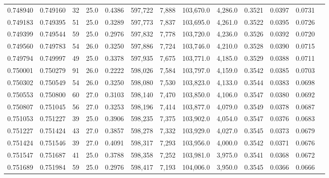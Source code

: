 \begin{tabular}{rrrrrrrrrrrrr}
0.748940 & 0.749160 &    32 & 25.0 &                                     0.4386 & 597,722 &   7,888 & 103,670.0 &   4,286.0 & 0.3521 & 0.0397 & 0.0731 \\
0.749183 & 0.749395 &    51 & 25.0 &                                     0.3289 & 597,773 &   7,837 & 103,695.0 &   4,261.0 & 0.3522 & 0.0395 & 0.0726 \\
0.749399 & 0.749544 &    59 & 25.0 &                                     0.2976 & 597,832 &   7,778 & 103,720.0 &   4,236.0 & 0.3526 & 0.0392 & 0.0720 \\
0.749560 & 0.749783 &    54 & 26.0 &                                     0.3250 & 597,886 &   7,724 & 103,746.0 &   4,210.0 & 0.3528 & 0.0390 & 0.0715 \\
0.749794 & 0.749997 &    49 & 25.0 &                                     0.3378 & 597,935 &   7,675 & 103,771.0 &   4,185.0 & 0.3529 & 0.0388 & 0.0711 \\
0.750001 & 0.750279 &    91 & 26.0 &                                     0.2222 & 598,026 &   7,584 & 103,797.0 &   4,159.0 & 0.3542 & 0.0385 & 0.0703 \\
0.750302 & 0.750549 &    54 & 26.0 &                                     0.3250 & 598,080 &   7,530 & 103,823.0 &   4,133.0 & 0.3544 & 0.0383 & 0.0698 \\
0.750553 & 0.750800 &    60 & 27.0 &                                     0.3103 & 598,140 &   7,470 & 103,850.0 &   4,106.0 & 0.3547 & 0.0380 & 0.0692 \\
0.750807 & 0.751045 &    56 & 27.0 &                                     0.3253 & 598,196 &   7,414 & 103,877.0 &   4,079.0 & 0.3549 & 0.0378 & 0.0687 \\
0.751053 & 0.751227 &    39 & 25.0 &                                     0.3906 & 598,235 &   7,375 & 103,902.0 &   4,054.0 & 0.3547 & 0.0376 & 0.0683 \\
0.751227 & 0.751424 &    43 & 27.0 &                                     0.3857 & 598,278 &   7,332 & 103,929.0 &   4,027.0 & 0.3545 & 0.0373 & 0.0679 \\
0.751424 & 0.751546 &    39 & 27.0 &                                     0.4091 & 598,317 &   7,293 & 103,956.0 &   4,000.0 & 0.3542 & 0.0371 & 0.0676 \\
0.751547 & 0.751687 &    41 & 25.0 &                                     0.3788 & 598,358 &   7,252 & 103,981.0 &   3,975.0 & 0.3541 & 0.0368 & 0.0672 \\
0.751689 & 0.751984 &    59 & 25.0 &                                     0.2976 & 598,417 &   7,193 & 104,006.0 &   3,950.0 & 0.3545 & 0.0366 & 0.0666 \\

\end{tabular}
